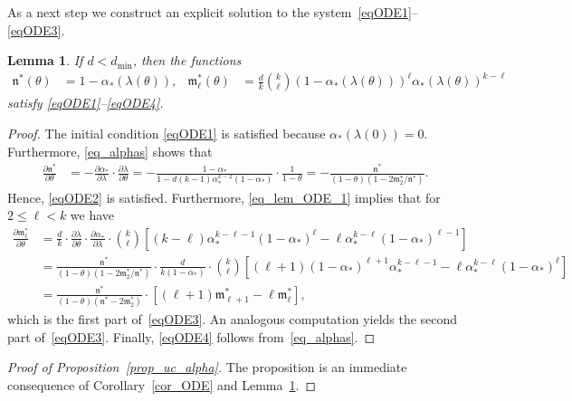 \documentclass[10pt,reqno]{amsart}
\numberwithin{equation}{section}
\newcommand\dmin{d_{\mathrm{min}}}
\newcommand\fm{\mathfrak m}
\newcommand\fn{\mathfrak n}
\newcommand\brk[1]{\left\lbrack{#1}\right\rbrack}
\newcommand\Lem{Lemma}
\newcommand\Prop{Proposition}
\newcommand\Cor{Corollary}
\newtheorem{lemma}[definition]{Lemma}
\begin{document}
As a next step we construct an explicit solution to the system~\eqref{eqODE1}--\eqref{eqODE3}.

\begin{lemma}\label{lem_ODE}
	If $d<\dmin$, then the functions
	\begin{align}\label{eq_lem_ODE}
		\fn^*(\theta)&=1-\alpha_*(\lambda(\theta)),&
		\fm^*_\ell(\theta)&=\frac dk\binom{k}\ell(1-\alpha_*(\lambda(\theta)))^\ell\alpha_*(\lambda(\theta))^{k-\ell}
	\end{align}
	satisfy \eqref{eqODE1}--\eqref{eqODE4}.
\end{lemma}
\begin{proof}
	The initial condition \eqref{eqODE1} is satisfied because $\alpha_*(\lambda(0))=0$.
	Furthermore, \eqref{eq_alphas} shows that
	\begin{align}\label{eq_lem_ODE_1}
		\frac{\partial\fn^*}{\partial\theta}&=
		-\frac{\partial\alpha_*}{\partial\lambda}\cdot\frac{\partial\lambda}{\partial\theta}=-\frac{1- \alpha_*}{1-d(k-1)\alpha_*^{k-2}(1-\alpha_*)}\cdot\frac1{1-\theta}=-\frac{\fn^*}{(1-\theta)(1-2\fm_2^*/\fn^*)}.
	\end{align}
	Hence, \eqref{eqODE2} is satisfied.
	Furthermore, \eqref{eq_lem_ODE_1} implies that for $2\leq\ell<k$ we have
	\begin{align*}
		\frac{\partial\fm_\ell^*}{\partial\theta}&=\frac dk\cdot\frac{\partial\lambda}{\partial\theta}\cdot\frac{\partial\alpha_*}{\partial\lambda}\cdot\binom{k}{\ell}\brk{(k-\ell)\alpha_*^{k-\ell-1}(1-\alpha_*)^{\ell}-\ell\alpha_*^{k-\ell}(1-\alpha_*)^{\ell-1}}\\
												 &=\frac{\fn^*}{(1-\theta)(1-2\fm_2^*/\fn^*)}\cdot\frac d{k(1-\alpha_*)}\cdot\binom k\ell\brk{(\ell+1)(1-\alpha_*)^{\ell+1}\alpha_*^{k-\ell-1}-\ell \alpha_*^{k-\ell}(1-\alpha_*)^\ell}\\
												 &=\frac{\fn^*}{(1-\theta)(\fn^*-2\fm_2^*)}\cdot\brk{(\ell+1)\fm_{\ell+1}^*-\ell\fm_\ell^*},
	\end{align*}
	which is the first part of~\eqref{eqODE3}.
	An analogous computation yields the second part of~\eqref{eqODE3}.
	Finally, \eqref{eqODE4} follows from~\eqref{eq_alphas}.
\end{proof}



\begin{proof}[Proof of \Prop~\ref{prop_uc_alpha}]
	The proposition	is an immediate consequence of \Cor~\ref{cor_ODE} and \Lem~\ref{lem_ODE}.
\end{proof}
\end{document}
